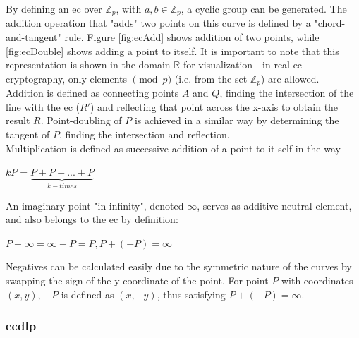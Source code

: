 By defining an \gls{ec} over $\mathbb{Z}_p$, with $a, b \in \mathbb{Z}_p$, a cyclic group can be generated. The addition operation that "adds" two points on
this curve is defined by a "chord-and-tangent" rule. Figure \ref{fig:ecAdd}
shows addition of two points, while \ref{fig:ecDouble} shows adding a point to itself. It is important to note that this representation is shown in the domain
$\mathbb{R}$ for visualization - in real \gls{ec} cryptography, only elements $\pmod p$ (i.e. from the set $\mathbb{Z}_p$)
are allowed. 
\\
Addition is defined as connecting points $A$ and 
$Q$, finding the intersection of the line with the \gls{ec} ($R'$) and reflecting that point across the x-axis to obtain the result $R$.
Point-doubling of $P$ is achieved in a similar way by determining the tangent of $P$, finding the intersection and reflection. 
\\
% 
% 
Multiplication is defined as successive addition of a point to it self in the way

\begin{center}
 $kP = \underbrace{P+P+...+P}_{k-times}$
\end{center}
An imaginary point "in infinity", denoted $\infty$, serves as additive neutral element, and also belongs to the \gls{ec} by definition:

\begin{center}
 $P + \infty = \infty + P = P, P + (-P) = \infty$
\end{center}
Negatives can be calculated easily due to the symmetric nature of the curves by swapping the sign of the y-coordinate of the point. For point $P$ with coordinates $(x, y)$, $-P$ is defined as
$(x,-y)$, thus satisfying $P + (-P) = \infty$.

\subsubsection{\gls{ecdlp}}\label{ecdp}

